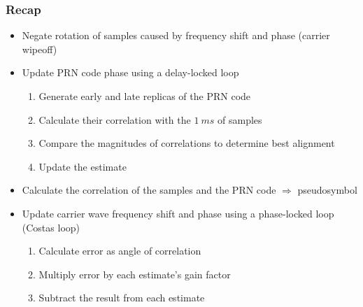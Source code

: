 \documentclass[aspectratio=169]{beamer}
\begin{document}
\begin{frame}
    \frametitle{Recap}

    \begin{itemize}
        \item<2-> Negate rotation of samples caused by frequency shift and phase (carrier wipeoff)
        
        \item<3-> Update PRN code phase using a delay-locked loop
        
        \begin{enumerate}
            \item<4-> Generate early and late replicas of the PRN code
            
            \item<5-> Calculate their correlation with the $\qty{1}{ms}$ of samples

            \item<6-> Compare the magnitudes of correlations to determine best alignment
            
            \item<7-> Update the estimate
        \end{enumerate}

        \item<8-> Calculate the correlation of the samples and the PRN code $\Rightarrow$ pseudosymbol
        
        \item<9-> Update carrier wave frequency shift and phase using a phase-locked loop (Costas loop)
        
        \begin{enumerate}
            \item<10-> Calculate error as angle of correlation

            \item<11-> Multiply error by each estimate's gain factor

            \item<12-> Subtract the result from each estimate
        \end{enumerate}
    \end{itemize}
\end{frame}
\end{document}

